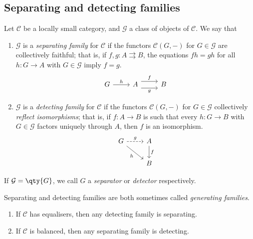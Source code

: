 \subsection{Separating and detecting families}
\begin{definition}
    Let \( \mathcal C \) be a locally small category, and \( \mathcal G \) a class of objects of \( \mathcal C \).
    We say that
    \begin{enumerate}
        \item \( \mathcal G \) is a \emph{separating family} for \( \mathcal C \) if the functors \( \mathcal C(G, -) \) for \( G \in \mathcal G \) are collectively faithful; that is, if \( f, g : A \rightrightarrows B \), the equations \( fh = gh \) for all \( h : G \to A \) with \( G \in \mathcal G \) imply \( f = g \).
        \[\begin{tikzcd}
            G & A & B
            \arrow["h", from=1-1, to=1-2]
            \arrow["f", shift left=2, from=1-2, to=1-3]
            \arrow["g"', shift right=2, from=1-2, to=1-3]
        \end{tikzcd}\]
        \item \( \mathcal G \) is a \emph{detecting family} for \( \mathcal C \) if the functors \( \mathcal C(G, -) \) for \( G \in \mathcal G \) collectively \emph{reflect isomorphisms}; that is, if \( f : A \to B \) is such that every \( h : G \to B \) with \( G \in \mathcal G \) factors uniquely through \( A \), then \( f \) is an isomorphism.
        \[\begin{tikzcd}
            G & A \\
            & B
            \arrow["g", dashed, from=1-1, to=1-2]
            \arrow["f", from=1-2, to=2-2]
            \arrow["h"', from=1-1, to=2-2]
        \end{tikzcd}\]
    \end{enumerate}
    If \( \mathcal G = \qty{G} \), we call \( G \) a \emph{separator} or \emph{detector} respectively.
\end{definition}
Separating and detecting families are both sometimes called \emph{generating families}.
\begin{lemma}
    \begin{enumerate}
        \item If \( \mathcal C \) has equalisers, then any detecting family is separating.
        \item If \( \mathcal C \) is balanced, then any separating family is detecting.
    \end{enumerate}
\end{lemma}
